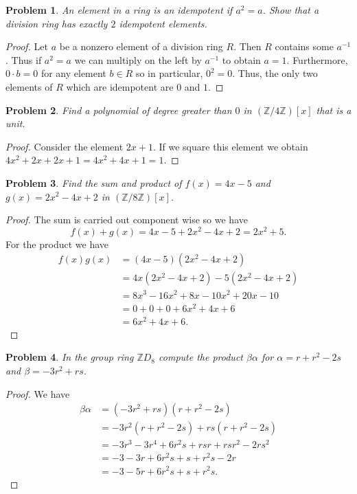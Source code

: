 \documentclass{article}
\newtheorem{problem}{Problem}
\begin{document}

\begin{problem}
An element in a ring is an idempotent if $a^2 = a$. Show that a division ring has exactly $2$ idempotent elements.
\end{problem}
\begin{proof}
Let $a$ be a nonzero element of a division ring $R$. Then $R$ contains some $a^{-1}$. Thus if $a^2 = a$ we can multiply on the left by $a^{-1}$ to obtain $a = 1$. Furthermore, $0 \cdot b = 0$ for any element $b \in R$ so in particular, $0^2 = 0$. Thus, the only two elements of $R$ which are idempotent are $0$ and $1$.
\end{proof}

\begin{problem}
Find a polynomial of degree greater than $0$ in $(\mathbb{Z}/4\mathbb{Z})[x]$ that is a unit.
\end{problem}
\begin{proof}
Consider the element $2x+1$. If we square this element we obtain $4x^2 + 2x + 2x + 1 = 4x^2 + 4x + 1 = 1$.
\end{proof}

\begin{problem}
Find the sum and product of $f(x) = 4x - 5$ and $g(x) = 2x^2 - 4x + 2$ in $(\mathbb{Z}/8\mathbb{Z})[x]$.
\end{problem}
\begin{proof}
The sum is carried out component wise so we have
\[
f(x) + g(x) = 4x - 5 + 2x^2 - 4x + 2 = 2x^2 + 5.
\]
For the product we have
\begin{align*}
f(x)g(x)
&= (4x - 5)(2x^2 - 4x + 2)\\
&= 4x(2x^2 - 4x + 2) - 5(2x^2 - 4x + 2)\\
&= 8x^3 - 16x^2 + 8x - 10x^2 + 20x - 10\\
&= 0 + 0 + 0 + 6x^2 + 4x + 6\\
&= 6x^2 + 4x + 6.
\end{align*}
\end{proof}

\begin{problem}
In the group ring $\mathbb{Z}D_8$ compute the product $\beta \alpha$ for $\alpha = r + r^2 - 2s$ and $\beta = -3r^2 + rs$.
\end{problem}
\begin{proof}
We have
\begin{align*}
\beta \alpha
&= (-3r^2 + rs)(r + r^2 - 2s)\\
&= -3r^2(r + r^2 - 2s) + rs(r + r^2 - 2s)\\
&= -3r^3 - 3r^4 + 6r^2s + rsr + rsr^2 - 2rs^2\\
&= -3 - 3r + 6r^2s + s + r^2s - 2r\\
&= -3 - 5r + 6r^2s + s + r^2s.
\end{align*}
\end{proof}
\end{document}
